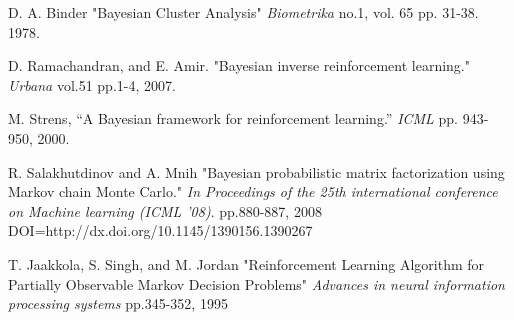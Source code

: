 \documentclass[a4paper]{article}
\begin{document}
\begin{thebibliography}{9}
    D. A. Binder "Bayesian Cluster Analysis" 
    \textit{Biometrika} no.1, vol. 65 pp. 31-38. 1978.

    D. Ramachandran, and E. Amir. "Bayesian inverse reinforcement 
    learning." \textit{Urbana}  vol.51 pp.1-4, 2007. 

    M. Strens, “A Bayesian framework for reinforcement learning.” 
    \textit{ICML} pp. 943-950, 2000. 

    R. Salakhutdinov and A. Mnih "Bayesian probabilistic matrix factorization 
    using Markov chain Monte Carlo." \textit{In Proceedings of the 25th 
    international conference on Machine learning (ICML '08)}. 
    pp.880-887, 2008 DOI=http://dx.doi.org/10.1145/1390156.1390267

    T. Jaakkola, S. Singh, and M. Jordan "Reinforcement Learning 
    Algorithm for Partially Observable Markov Decision Problems" 
    \textit{ Advances in neural information processing systems}
    pp.345-352, 1995


\end{thebibliography}
\end{document}
